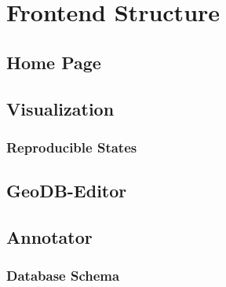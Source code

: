 \chapter{Frontend Structure}

\section{Home Page}


\section{Visualization}

\subsection{Reproducible States}
\label{sec:vis-reproducible}

\section{GeoDB-Editor}


\section{Annotator}
\label{sec:annotator}


\subsection{Database Schema}
\label{sec:database-schema}

